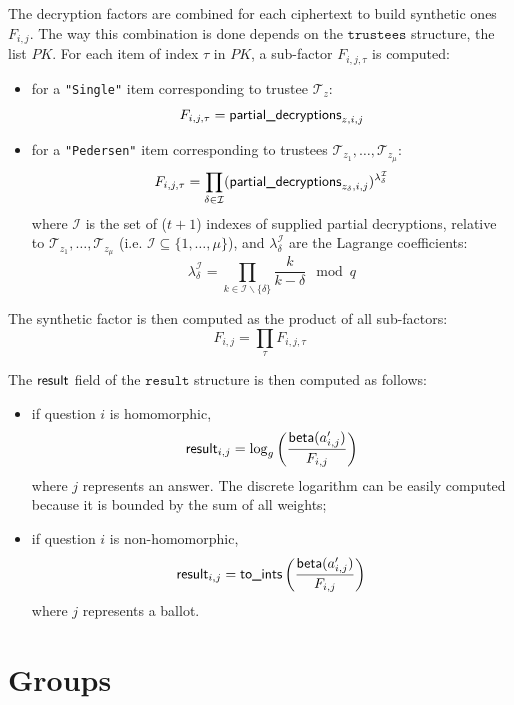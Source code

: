 \documentclass[a4paper]{article}
\newcommand{\result}{\texttt{result}}
\begin{document}
The decryption factors are combined for each ciphertext to build
synthetic ones $F_{i,j}$. The way this combination is done depends on
the $\texttt{trustees}$ structure, the list $PK$. For each item of
index $\tau$ in $PK$, a sub-factor $F_{i,j,\tau}$ is computed:
\begin{itemize}
\item for a \texttt{"Single"} item corresponding to trustee
  $\mathcal{T}_z$:
  \[
    F_{i,j,\tau}=\textsf{partial\_decryptions}_{z,i,j}
  \]
\item for a \texttt{"Pedersen"} item corresponding to trustees
  $\mathcal{T}_{z_1},\dots,\mathcal{T}_{z_\mu}$:
  \[
    F_{i,j,\tau}=\prod_{\delta\in\mathcal{I}}(\textsf{partial\_decryptions}_{z_\delta,i,j})^{\lambda_\delta^{\mathcal{I}}}
  \]
  where $\mathcal{I}$ is the set of ($t+1$) indexes of supplied
  partial decryptions, relative to
  $\mathcal{T}_{z_1},\dots,\mathcal{T}_{z_\mu}$ (i.e. $\mathcal{I}\subseteq\{1,\dots,\mu\}$), and
  $\lambda_\delta^{\mathcal{I}}$ are the Lagrange coefficients:
  \[
    \lambda_\delta^{\mathcal{I}}=\prod_{k\in\mathcal{I}\backslash\{\delta\}}\frac{k}{k-\delta}\mod q
  \]
\end{itemize}
The synthetic factor is then computed as the product of all sub-factors:
\[
  F_{i,j}=\prod_\tau F_{i,j,\tau}
\]

The $\textsf{result}$ field of the $\result$ structure is then computed
as follows:
\begin{itemize}
\item if question $i$ is homomorphic,
  \[
    \textsf{result}_{i,j}=\log_g\left(\frac{\textsf{beta}(a'_{i,j})}{F_{i,j}}\right)
  \]
  where $j$ represents an answer. The discrete logarithm can be easily
  computed because it is bounded by the sum of all weights;
\item if question $i$ is non-homomorphic,
  \[
    \textsf{result}_{i,j}=\textsf{to\_ints}\left(\frac{\textsf{beta}(a'_{i,j})}{F_{i,j}}\right)
  \]
  where $j$ represents a ballot.
\end{itemize}

\section{Groups}
\label{default-group}
\end{document}
